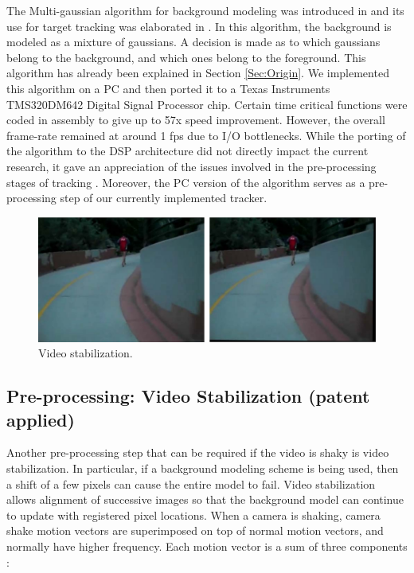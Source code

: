 \documentclass[12pt,letterpaper,doublespaced,ETD,proposal]{gt-ece-thesis}
\begin{document}
\begin{Body}
The Multi-gaussian algorithm for background modeling was introduced in \cite{1999_CNF_RealTimeTracking_Stauffer} and its use for target tracking was elaborated in \cite{2000_JNL_MG_Stauffer}.  In this algorithm, the background is modeled as a mixture of gaussians.  A decision is made as to which gaussians belong to the background, and which ones belong to the foreground.  This algorithm has already been explained in Section \ref{Sec:Origin}.  We implemented this algorithm on a PC and then ported it to a Texas Instruments TMS320DM642 Digital Signal Processor chip.  Certain time critical functions were coded in assembly to give up to 57x speed improvement.  However, the overall frame-rate remained at around 1 fps due to I/O bottlenecks.  While the porting of the algorithm to the DSP architecture did not directly impact the current research, it gave an appreciation of the issues involved in the pre-processing stages of tracking \cite{2008_TECH_MGDSP_Aslam}.  Moreover, the PC version of the algorithm serves as a pre-processing step of our currently implemented tracker.

			\begin{figure}		
					\centering		
					\includegraphics[width=1.0\textwidth]{figs/Proposal_fig13_TRK_deshaker}
					\caption{Video stabilization.}
					\label{fig:Deshaker}
			\end{figure}
			
\subsection{Pre-processing: Video Stabilization (patent applied)}
Another pre-processing step that can be required if the video is shaky is video stabilization.  In particular, if a background modeling scheme is being used, then a shift of a few pixels can cause the entire model to fail.  Video stabilization allows alignment of successive images so that the background model can continue to update with registered pixel locations.  When a camera is shaking, camera shake motion vectors are superimposed on top of normal motion vectors, and normally have higher frequency.  Each motion vector is a sum of three components \cite{2006_CNF_Stabilization_Batur}:


\end{Body}
\end{document}
